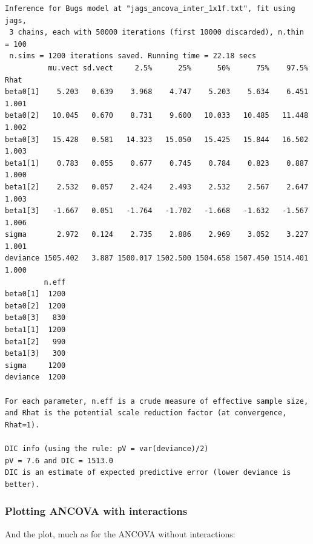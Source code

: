 \documentclass[
  13,
  letterpaper,
]{report}
\begin{document}
\begin{verbatim}
Inference for Bugs model at "jags_ancova_inter_1x1f.txt", fit using jags,
 3 chains, each with 50000 iterations (first 10000 discarded), n.thin = 100
 n.sims = 1200 iterations saved. Running time = 22.18 secs
          mu.vect sd.vect     2.5%      25%      50%      75%    97.5%  Rhat
beta0[1]    5.203   0.639    3.968    4.747    5.203    5.634    6.451 1.001
beta0[2]   10.045   0.670    8.731    9.600   10.033   10.485   11.448 1.002
beta0[3]   15.428   0.581   14.323   15.050   15.425   15.844   16.502 1.003
beta1[1]    0.783   0.055    0.677    0.745    0.784    0.823    0.887 1.000
beta1[2]    2.532   0.057    2.424    2.493    2.532    2.567    2.647 1.003
beta1[3]   -1.667   0.051   -1.764   -1.702   -1.668   -1.632   -1.567 1.006
sigma       2.972   0.124    2.735    2.886    2.969    3.052    3.227 1.001
deviance 1505.402   3.887 1500.017 1502.500 1504.658 1507.450 1514.401 1.000
         n.eff
beta0[1]  1200
beta0[2]  1200
beta0[3]   830
beta1[1]  1200
beta1[2]   990
beta1[3]   300
sigma     1200
deviance  1200

For each parameter, n.eff is a crude measure of effective sample size,
and Rhat is the potential scale reduction factor (at convergence, Rhat=1).

DIC info (using the rule: pV = var(deviance)/2)
pV = 7.6 and DIC = 1513.0
DIC is an estimate of expected predictive error (lower deviance is better).
\end{verbatim}

\subsubsection{Plotting ANCOVA with
interactions}\label{plotting-ancova-with-interactions}

And the plot, much as for the ANCOVA without interactions:
\end{document}
